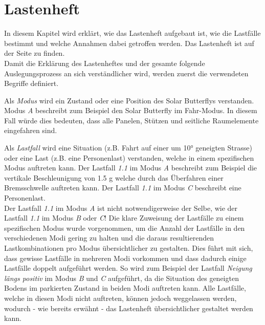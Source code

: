 \section{Lastenheft}
\label{Lastenheft}
In diesem Kapitel wird erklärt, wie das Lastenheft aufgebaut ist, wie die Lastfälle bestimmt und welche Annahmen dabei getroffen werden. Das Lastenheft ist auf der Seite \pageref{Lastenheft A} zu finden.\\

Damit die Erklärung des Lastenheftes und der gesamte folgende Auslegungsprozess an sich verständlicher wird, werden zuerst die verwendeten Begriffe definiert.

Als \emph{Modus} wird ein Zustand oder eine Position des Solar Butterflys verstanden. Modus \emph{A} beschreibt zum Beispiel den Solar Butterfly im \glqq Fahr-Modus\grqq{}. In diesem Fall würde dies bedeuten, dass alle Panelen, Stützen und seitliche Raumelemente eingefahren sind.

Als \emph{Lastfall} wird eine Situation (z.B. Fahrt auf einer um 10° geneigten Strasse) oder eine Last (z.B. eine Personenlast) verstanden, welche in einem spezifischen Modus auftreten kann. Der Lastfall \emph{1.1} im Modus \emph{A} beschreibt zum Beispiel die vertikale Beschleunigung von 1.5 g welche durch das Überfahren einer Bremsschwelle auftreten kann. Der Lastfall \emph{1.1} im Modus \emph{C} beschreibt eine Personenlast.\\
Der Lastfall \emph{1.1} im Modus \emph{A} ist nicht notwendigerweise der Selbe, wie der Lastfall \emph{1.1} im Modus \emph{B} oder \emph{C}! Die klare Zuweisung der Lastfälle zu einem spezifischen Modus wurde vorgenommen, um die Anzahl der Lastfälle in den verschiedenen Modi gering zu halten und die daraus resultierenden Lastkombinationen pro Modus übersichtlicher zu gestalten. Dies führt mit sich, dass gewisse Lastfälle in mehreren Modi vorkommen und dass dadurch einige Lastfälle doppelt aufgeführt werden. So wird zum Beispiel der Lastfall \emph{Neigung längs positiv} im Modus \emph{B} und \emph{C} aufgeführt, da die Situation des geneigten Bodens im parkierten Zustand in beiden Modi auftreten kann. Alle Lastfälle, welche in diesen Modi nicht auftreten, können jedoch weggelassen werden, wodurch - wie bereits erwähnt - das Lastenheft übersichtlicher gestaltet werden kann.


